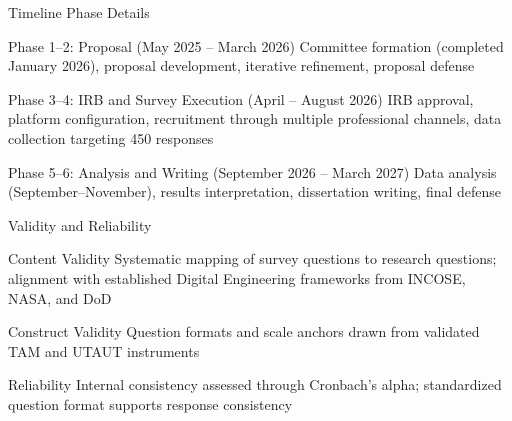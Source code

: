 \documentclass{beamer}
\begin{document}
\begin{frame}[allowframebreaks]{Timeline Phase Details}
  \begin{block}{Phase 1--2: Proposal (May 2025 -- March 2026)}
    Committee formation (completed January 2026), proposal development, iterative refinement, proposal defense
  \end{block}

  \begin{block}{Phase 3--4: IRB and Survey Execution (April -- August 2026)}
    IRB approval, platform configuration, recruitment through multiple professional channels, data collection targeting 450 responses
  \end{block}

  \begin{block}{Phase 5--6: Analysis and Writing (September 2026 -- March 2027)}
    Data analysis (September--November), results interpretation, dissertation writing, final defense
  \end{block}
\end{frame}

\begin{frame}[allowframebreaks]{Validity and Reliability}
  \begin{block}{Content Validity}
    Systematic mapping of survey questions to research questions; alignment with established Digital Engineering frameworks from INCOSE, NASA, and DoD
  \end{block}

  \begin{block}{Construct Validity}
    Question formats and scale anchors drawn from validated TAM and UTAUT instruments
  \end{block}

  \begin{block}{Reliability}
    Internal consistency assessed through Cronbach's alpha; standardized question format supports response consistency
  \end{block}
\end{frame}
\end{document}

